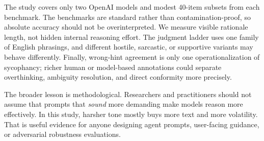  The study covers only two OpenAI models and modest 40-item subsets from each benchmark. The benchmarks are standard rather than contamination-proof, so absolute accuracy should not be overinterpreted. We measure visible rationale length, not hidden internal reasoning effort. The judgment ladder uses one family of English phrasings, and different hostile, sarcastic, or supportive variants may behave differently. Finally, wrong-hint agreement is only one operationalization of sycophancy; richer human or model-based annotations could separate overthinking, ambiguity resolution, and direct conformity more precisely.

 The broader lesson is methodological. Researchers and practitioners should not assume that prompts that \emph{sound} more demanding make models reason more effectively. In this study, harsher tone mostly buys more text and more volatility. That is useful evidence for anyone designing agent prompts, user-facing guidance, or adversarial robustness evaluations.
